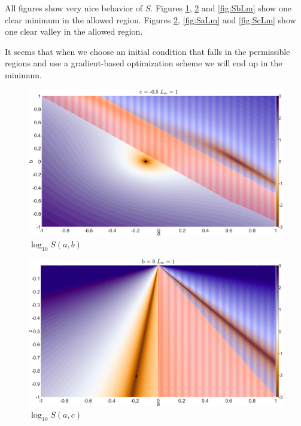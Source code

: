 \documentclass{article}
\begin{document}
All figures show very nice behavior of $S$. Figures \ref{fig:Sab}, \ref{fig:Sac} and \ref{fig:SbLm} show one clear minimum in the allowed region. Figures \ref{fig:Sac}, \ref{fig:SaLm} and \ref{fig:ScLm} show one clear valley in the allowed region. 

It seems that when we choose an initial condition that falls in the permissible regions and use a gradient-based optimization scheme we will end up in the minimum. %

\begin{figure}[htbp]
		\centering \includegraphics[width = \textwidth]{leastsquaresab.png}
		\caption{$\log_{10}S(a,b)$}\label{fig:Sab}
\end{figure}
\begin{figure}[htbp]
		\centering \includegraphics[width = \textwidth]{leastsquaresac.png}
		\caption{$\log_{10}S(a,c)$}\label{fig:Sac}
\end{figure}
\end{document}
